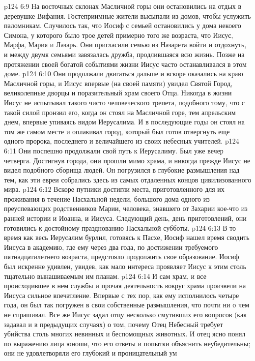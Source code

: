 \vs p124 6:9 На восточных склонах Масличной горы они остановились на отдых в деревушке Вифания. Гостеприимные жители высыпали из домов, чтобы услужить паломникам. Случилось так, что Иосиф с семьей остановились у дома некоего Симона, у которого было трое детей примерно того же возраста, что Иисус, Марфа, Мария и Лазарь. Они пригласили семью из Назарета войти и отдохнуть, и между двумя семьями завязалась дружба, продлившаяся всю жизнь. Позже на протяжении своей богатой событиями жизни Иисус часто останавливался в этом доме.
\vs p124 6:10 Они продолжали двигаться дальше и вскоре оказались на краю Масличной горы, и Иисус впервые (на своей памяти) увидел Святой Город, великолепные дворцы и поразительный храм своего Отца. Никогда в жизни Иисус не испытывал такого чисто человеческого трепета, подобного тому, что с такой силой пронзил его, когда он стоял на Масличной горе, тем апрельским днем, впервые упиваясь видом Иерусалима. И в последующие годы он стоял на том же самом месте и оплакивал город, который был готов отвергнуть еще одного пророка, последнего и величайшего из своих небесных учителей.
\vs p124 6:11 Они поспешно продолжали свой путь к Иерусалиму. Был уже вечер четверга. Достигнув города, они прошли мимо храма, и никогда прежде Иисус не видел подобного сборища людей. Он погрузился в глубокие размышления над тем, как эти евреи собрались здесь из самых отдаленных концов цивилизованного мира.
\vs p124 6:12 Вскоре путники достигли места, приготовленного для их проживания в течение Пасхальной недели, большого дома одного из преуспевающих родственников Марии, человека, знавшего от Захарии кое\hyp{}что из ранней истории и Иоанна, и Иисуса. Следующий день, день приготовлений, они готовились к достойному празднованию Пасхальной субботы.
\vs p124 6:13 В то время как весь Иерусалим бурлил, готовясь к Пасхе, Иосиф нашел время сводить Иисуса в академию, где ему через два года, по достижении требуемого пятнадцатилетнего возраста, предстояло продолжить свое образование. Иосиф был искренне удивлен, увидев, как мало интереса проявляет Иисус к этим столь тщательно вынашиваемым им планам.
\vs p124 6:14 И сам храм, и все происходившее в нем службы и прочая деятельность вокруг храма произвели на Иисуса сильное впечатление. Впервые с тех пор, как ему исполнилось четыре года, он был так погружен в свои собственные размышления, что почти ни о чем не спрашивал. Все же Иисус задал отцу несколько смутивших его вопросов (как задавал и в предыдущих случаях) о том, почему Отец Небесный требует убийства столь многих невинных и беспомощных животных. И отец ясно понял по выражению лица юноши, что его ответы и попытки объяснить неубедительны; они не удовлетворяли его глубокий и проницательный ум
